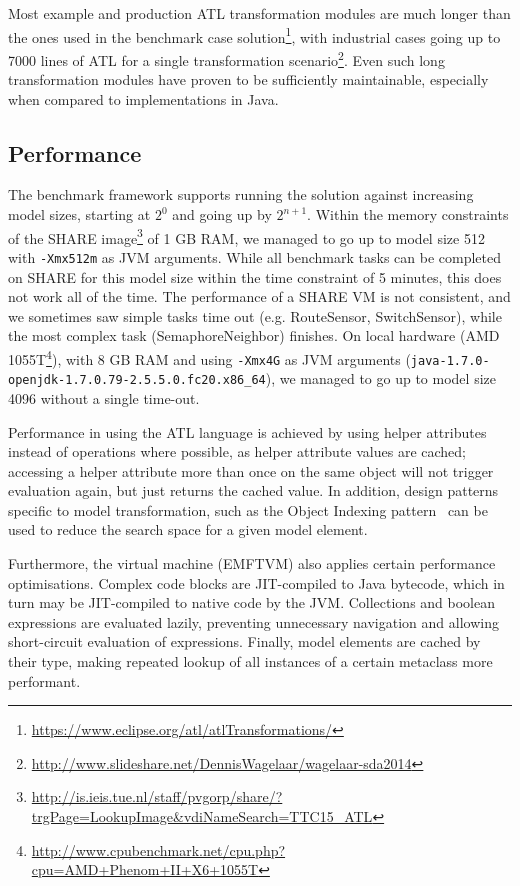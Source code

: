 \documentclass[submission,copyright,creativecommons]{eptcs}
\begin{document}
Most example and production ATL transformation modules are much longer than the ones used in the benchmark case solution\footnote{\url{https://www.eclipse.org/atl/atlTransformations/}}, with industrial cases going up to 7000 lines of ATL for a single transformation scenario\footnote{\url{http://www.slideshare.net/DennisWagelaar/wagelaar-sda2014}}. Even such long transformation modules have proven to be sufficiently maintainable, especially when compared to implementations in Java.

\subsection{Performance}

The benchmark framework supports running the solution against increasing model sizes, starting at $2^0$ and going up by $2^{n+1}$. Within the memory constraints of the SHARE image\footnote{\url{http://is.ieis.tue.nl/staff/pvgorp/share/?trgPage=LookupImage&vdiNameSearch=TTC15_ATL}} of 1 GB RAM, we managed to go up to model size 512 with \texttt{-Xmx512m} as JVM arguments. While all benchmark tasks can be completed on SHARE for this model size within the time constraint of 5 minutes, this does not work all of the time. The performance of a SHARE VM is not consistent, and we sometimes saw simple tasks time out (e.g. RouteSensor, SwitchSensor), while the most complex task (SemaphoreNeighbor) finishes. On local hardware (AMD 1055T\footnote{\url{http://www.cpubenchmark.net/cpu.php?cpu=AMD+Phenom+II+X6+1055T}}), with 8 GB RAM and using \texttt{-Xmx4G} as JVM arguments (\texttt{java-1.7.0-openjdk-1.7.0.79-2.5.5.0.fc20.x86\_64}), we managed to go up to model size 4096 without a single time-out.

Performance in using the ATL language is achieved by using helper attributes instead of operations where possible, as helper attribute values are cached; accessing a helper attribute more than once on the same object will not trigger evaluation again, but just returns the cached value. In addition, design patterns specific to model transformation, such as the Object Indexing pattern~\cite{conf/icsea/Lano2011} can be used to reduce the search space for a given model element.

Furthermore, the virtual machine (EMFTVM) also applies certain performance optimisations. Complex code blocks are JIT-compiled to Java bytecode, which in turn may be JIT-compiled to native code by the JVM. Collections and boolean expressions are evaluated lazily, preventing unnecessary navigation and allowing short-circuit evaluation of expressions. Finally, model elements are cached by their type, making repeated lookup of all instances of a certain metaclass more performant.



\end{document}
